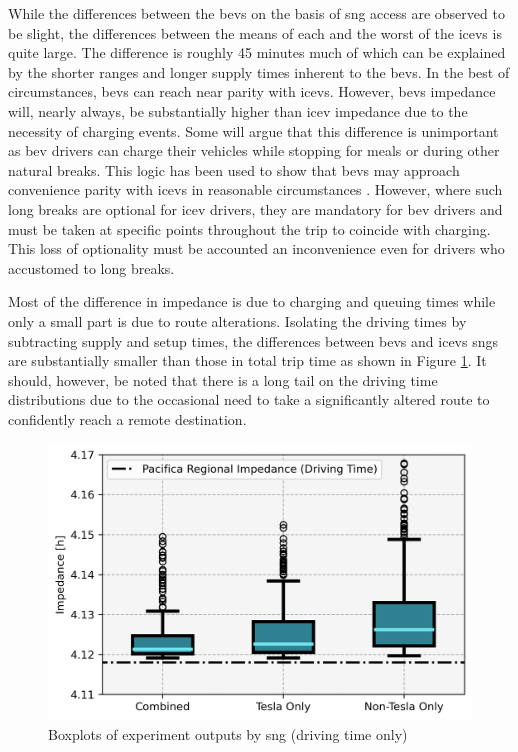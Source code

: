 \begin{multicols}{2}
While the differences between the \glspl{bev} on the basis of \gls{sng} access are observed to be slight, the differences between the means of each and the worst of the \glspl{icev} is quite large. The difference is roughly 45 minutes much of which can be explained by the shorter ranges and longer supply times inherent to the \glspl{bev}. In the best of circumstances, \glspl{bev} can reach near parity with \glspl{icev}. However, \glspl{bev} impedance will, nearly always, be substantially higher than \gls{icev} impedance due to the necessity of charging events. Some will argue that this difference is unimportant as \gls{bev} drivers can charge their vehicles while stopping for meals or during other natural breaks. This logic has been used to show that \glspl{bev} may approach convenience parity with \glspl{icev} in reasonable circumstances \cite{Dixon_2020}. However, where such long breaks are optional for \gls{icev} drivers, they are mandatory for \gls{bev} drivers and must be taken at specific points throughout the trip to coincide with charging. This loss of optionality must be accounted an inconvenience even for drivers who accustomed to long breaks.

Most of the difference in impedance is due to charging and queuing times while only a small part is due to route alterations. Isolating the driving times by subtracting supply and setup times, the differences between \glspl{bev} and \glspl{icev} \glspl{sng} are substantially smaller than those in total trip time as shown in Figure \ref{fig:networks_boxplots_driving}. It should, however, be noted that there is a long tail on the driving time distributions due to the occasional need to take a significantly altered route to confidently reach a remote destination.

\begin{figure}[H]
	\centering
	\includegraphics[width = \linewidth]{figs/Networks_Boxplots_Weighted_Impedance_Driving.png}
	\caption{Boxplots of experiment outputs by \gls{sng} (driving time only)}
	\label{fig:networks_boxplots_driving}
\end{figure}


\end{multicols}
